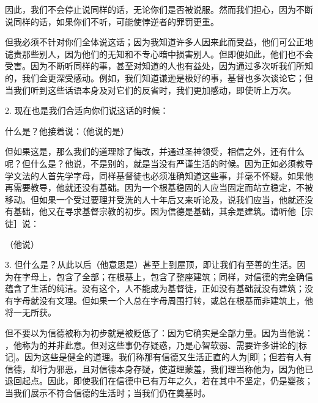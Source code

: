 因此，我们不会停止说同样的话，无论你们是否被说服。然而我们担心，因为不断说同样的话，如果你们不听，可能使悖逆者的罪罚更重。\par

但我必须不针对你们全体说这话；因为我知道许多人因来此而受益，他们可公正地谴责那些别人，因为他们的无知和不专心暗中损害别人。但即便如此，他们也不会受害。因为不断听同样的事，甚至对知道的人也有益处，因为通过多次听我们所知的，我们会更深受感动。例如，我们知道谦逊是极好的事，基督也多次谈论它；但当我们听到这些话语本身及对它们的反省时，我们更加感动，即使听上万次。\par

2. 现在也是我们合适向你们说这话的时候：\par

什么是？他接着说：（他说的是）\par

但如果这是，那么我们的道理除了悔改，并通过圣神领受，相信之外，还有什么呢？但什么是？他说，不是别的，就是当没有严谨生活的时候。因为正如必须教导学文法的人首先学字母，同样基督徒也必须准确知道这些事，并毫不怀疑。如果他再需要教导，他就还没有基础。因为一个根基稳固的人应当固定而站立稳定，不被移动。但如果一个受过要理并受洗的人十年后又来听论及，说我们应当，他就还没有基础，他又在寻求基督宗教的初步。因为信德是基础，其余是建筑。请听他［宗徒］说：\par

（他说）\par

3. 但什么是？从此以后（他意思是）甚至上到屋顶，即让我们有至善的生活。因为在字母上，包含了全部；在根基上，包含了整座建筑；同样，对信德的完全确信蕴含了生活的纯洁。没有这个，人不能成为基督徒，正如没有基础就没有建筑；没有字母就没有文理。但如果一个人总在字母周围打转，或总在根基而非建筑上，他将一无所获。\par

但不要以为信德被称为初步就是被贬低了：因为它确实是全部力量。因为当他说： ，他称为的并非此意。但对这些事仍存疑惑，乃是心智软弱、需要许多讲论的[标记]。因为这些是健全的道理。我们称那有信德又生活正直的人为[即]；但若有人有信德，却行为邪恶，且对信德本身存疑，使道理蒙羞，我们理当称他为，因为他已退回起点。因此，即使我们在信德中已有万年之久，若在其中不坚定，仍是婴孩；当我们展示不符合信德的生活时；当我们仍在奠基时。\par

